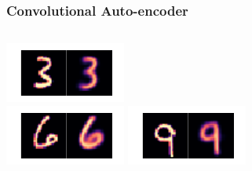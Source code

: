 \documentclass[10pt, usenames, dvipsnames, table]{beamer}
\begin{document}
\begin{frame}
  \frametitle{Convolutional Auto-encoder}
  \begin{columns}
    \includegraphics[width=\linewidth]
    {models/mnist_conv_e300_L2_b64/reconstruction_0} \\
    \vspace{2em}
    \includegraphics[width=\linewidth]
    {models/mnist_conv_e300_L2_b64/reconstruction_2}
    \includegraphics[width=\linewidth]
    {models/mnist_conv_e300_L2_b64/reconstruction_3} \\
    \vspace{2em}

\end{columns}
\end{frame}
\end{document}
